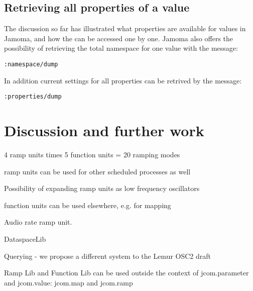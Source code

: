 \documentclass{sig-alternate}
\begin{document}

\subsection{Retrieving all properties of a value} %
\label{sub:retrieving_all_properties_of_a_value}

The discussion so far has illustrated what properties are available for values in Jamoma, and how the can be accessed one by one. Jamoma also offers the possibility of retrieving the total namespace for one value with the message: 

\texttt{:namespace/dump}

In addition current settings for all properties can be retrived by the message:

\texttt{:properties/dump}






\section{Discussion and further work} %
\label{sec:discussion_and_further_work}

4 ramp units times 5 function units = 20 ramping modes

ramp units can be used for other scheduled processes as well

Possibility of expanding ramp units as low frequency oscillators

function units can be used elsewhere, e.g. for mapping

Audio rate ramp unit.

DataspaceLib

Querying - we propose a different system to the Lemur OSC2 draft

Ramp Lib and Function Lib can be used outside the context of jcom.parameter and jcom.value: jcom.map and jcom.ramp







\end{document}
